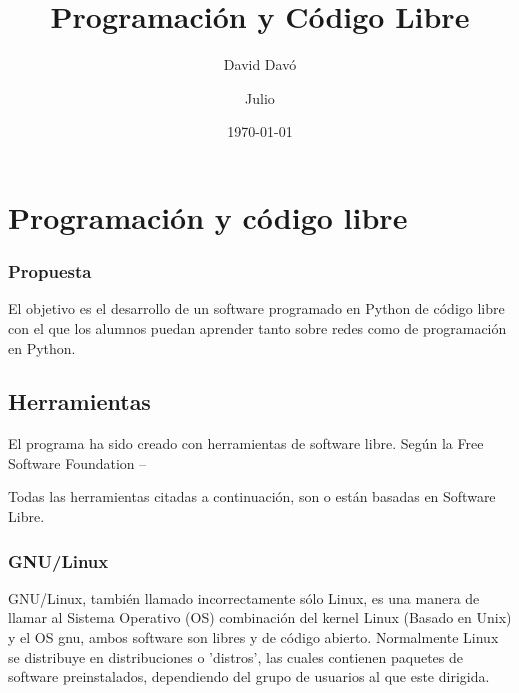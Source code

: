 \documentclass[a4paper, 11pt, twoside]{report} %
\title{Programación y Código Libre}
\author{David Davó \and Julio}
\date{\today{}}
\begin{document}
\begin{titlepage}
{\Large\maketitle}
\end{titlepage}
\clearpage

\tableofcontents
\newpage{}


\chapter{Programación y código libre}

\subsection*{Propuesta}
El objetivo es el desarrollo de un software programado en Python de código libre con el que los alumnos puedan aprender tanto sobre redes como de programación en Python.

\section{Herramientas}
El programa ha sido creado con herramientas de software libre. Según la Free Software Foundation
--\cite{FSF-Ph}

Todas las herramientas citadas a continuación, son o están basadas en Software Libre.

\subsection{GNU/Linux}
GNU/Linux, también llamado incorrectamente sólo Linux, es una manera de llamar al Sistema Operativo (OS) combinación del kernel Linux (Basado en Unix) y el OS \gls{gnu}, ambos software son libres y de código abierto. Normalmente Linux se distribuye en distribuciones o 'distros', las cuales contienen paquetes de software preinstalados, dependiendo del grupo de usuarios al que este dirigida.
\end{document}
